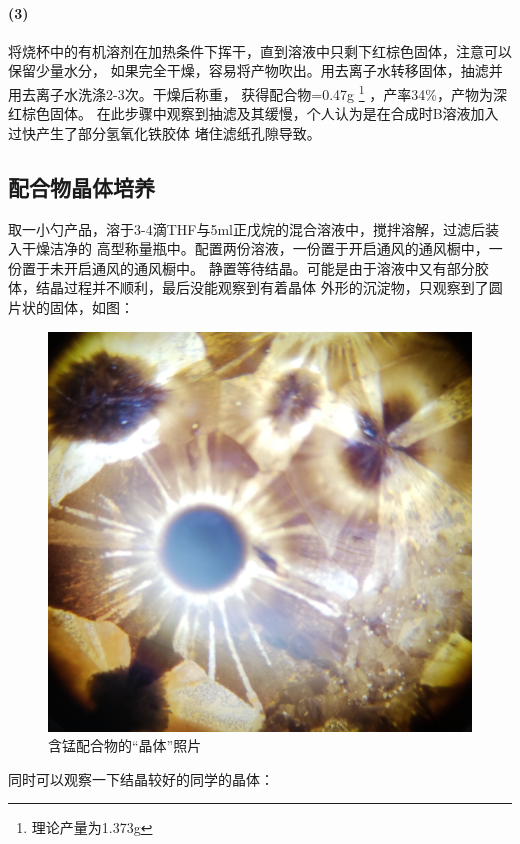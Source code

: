 \documentclass[a4paper,zihao=5,UTF8]{ctexart}
\begin{document}
	\paragraph{(3)}
	将烧杯中的有机溶剂在加热条件下挥干，直到溶液中只剩下红棕色固体，注意可以保留少量水分，
	如果完全干燥，容易将产物吹出。用去离子水转移固体，抽滤并用去离子水洗涤2-3次。干燥后称重，
	获得配合物=0.47g
	\footnote{理论产量为1.373g}
	，产率34\%，产物为深红棕色固体。
	在此步骤中观察到抽滤及其缓慢，个人认为是在合成时B溶液加入过快产生了部分氢氧化铁胶体
	堵住滤纸孔隙导致。
	\subsection{配合物晶体培养}
	取一小勺产品，溶于3-4滴THF与5ml正戊烷的混合溶液中，搅拌溶解，过滤后装入干燥洁净的
	高型称量瓶中。配置两份溶液，一份置于开启通风的通风橱中，一份置于未开启通风的通风橱中。
	静置等待结晶。可能是由于溶液中又有部分胶体，结晶过程并不顺利，最后没能观察到有着晶体
	外形的沉淀物，只观察到了圆片状的固体，如图：
	\begin{figure}[htbp]
		\centering
		\includegraphics[scale=0.1]{Mn_WCB.jpg}
		\caption{含锰配合物的“晶体”照片}
	\end{figure}
	\par 
	同时可以观察一下结晶较好的同学的晶体：
\end{document}

